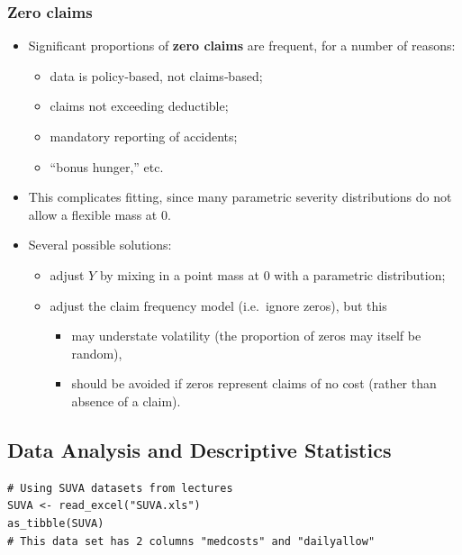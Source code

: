 \documentclass[11pt]{article}
\newcommand{\noi}{\noindent}
\begin{document}
\subsubsection{Zero claims}
\noi
\begin{itemize}
  \item Significant proportions of \textbf{zero claims} are frequent, for a number of reasons:
    \begin{itemize}
      \item data is policy‐based, not claims‐based;
      \item claims not exceeding deductible;
      \item mandatory reporting of accidents;
      \item “bonus hunger,” etc.
    \end{itemize}
  \item This complicates fitting, since many parametric severity distributions do not allow a flexible mass at 0.
  \item Several possible solutions:
    \begin{itemize}
      \item adjust \(Y\) by mixing in a point mass at 0 with a parametric distribution;
      \item adjust the claim frequency model (i.e.\ ignore zeros), but this
        \begin{itemize}
          \item may understate volatility (the proportion of zeros may itself be random),
          \item should be avoided if zeros represent claims of no cost (rather than absence of a claim).
        \end{itemize}
    \end{itemize}
\end{itemize}

\subsection{Data Analysis and Descriptive Statistics}
\begin{lstlisting}
# Using SUVA datasets from lectures
SUVA <- read_excel("SUVA.xls")
as_tibble(SUVA)
# This data set has 2 columns "medcosts" and "dailyallow"
\end{lstlisting}
\end{document}
